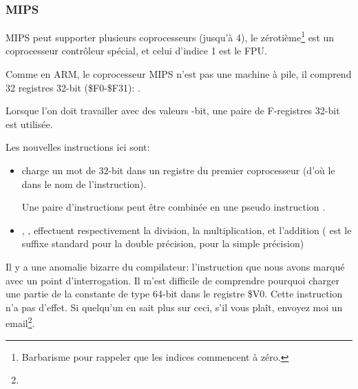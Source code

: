 \subsubsection{MIPS}

MIPS peut supporter plusieurs coprocesseurs (jusqu'à 4), le zérotième\footnote{Barbarisme
pour rappeler que les indices commencent à zéro.} est un coprocesseur contrôleur
spécial, et celui d'indice 1 est le FPU.

Comme en ARM, le coprocesseur MIPS n'est pas une machine à pile, il comprend 32 registres
32-bit (\$F0-\$F31):
.

Lorsque l'on doit travailler avec des valeurs -bit, une paire de F-registres
32-bit est utilisée.



Les nouvelles instructions ici sont:

\begin{itemize}

\item {} charge un mot de 32-bit dans un registre du premier coprocesseur
(d'où le  dans le nom de l'instruction).

Une paire d'instructions  peut être combinée en une pseudo instruction .

\item {}, ,  effectuent respectivement la division,
la multiplication, et l'addition ( est le suffixe standard pour la double précision,
 pour la simple précision)

\end{itemize}

\myindex{\CompilerAnomaly}
\label{MIPS_FPU_LUI}

Il y a une anomalie bizarre du compilateur: l'instruction  que nous avons
marqué avec un point d'interrogation.
Il m'est difficile de comprendre pourquoi charger une partie de la constante de type
64-bit \Tdouble dans le registre \$V0. Cette instruction n'a pas d'effet.
Si quelqu'un en sait plus sur ceci, s'il vous plaît, envoyez moi un email\footnote{\EMAIL}.

